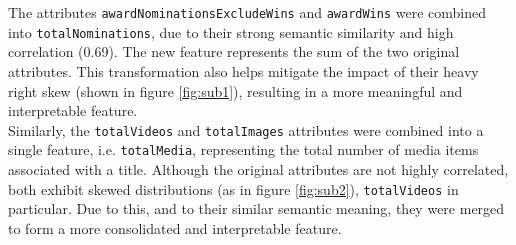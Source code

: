 The attributes \texttt{awardNominationsExcludeWins} and \texttt{awardWins} were combined into 
\texttt{totalNominations}, due to their strong semantic similarity and high correlation (0.69).
The new feature represents the sum of the two original attributes. This transformation also helps
mitigate the impact of their heavy right skew (shown in figure \ref{fig:sub1}), resulting in a more meaningful and interpretable feature.\\

Similarly, the \texttt{totalVideos} and \texttt{totalImages} attributes were combined into a single
feature, i.e. \texttt{totalMedia}, representing the total number of media items associated with a title.
Although the original attributes are not highly correlated, both exhibit skewed distributions (as in figure \ref{fig:sub2}), \texttt{totalVideos} in particular.
Due to this, and to their similar semantic meaning, they were merged to form a more consolidated and
interpretable feature.






